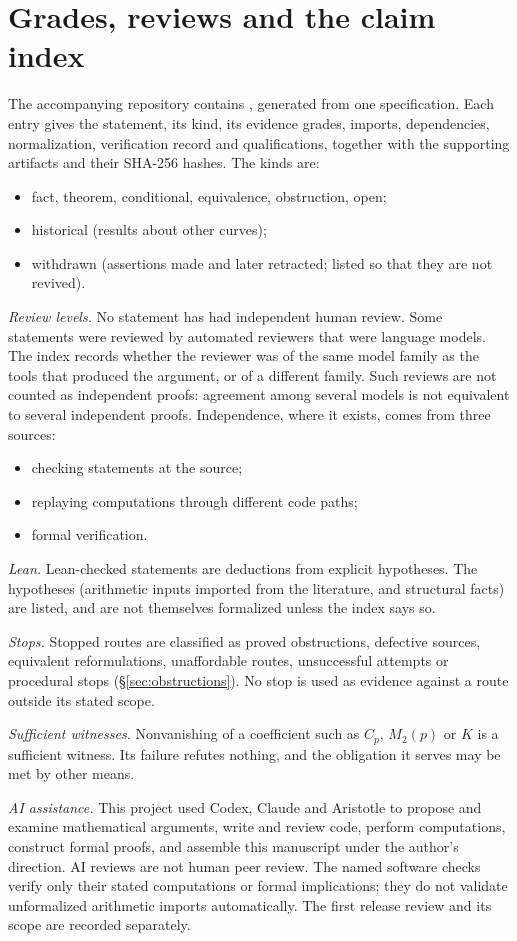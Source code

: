 \section{Grades, reviews and the claim index}\label{app:grades}

The accompanying repository contains , generated from one specification. Each entry gives the statement, its kind, its evidence grades, imports, dependencies, normalization, verification record and qualifications, together with the supporting artifacts and their SHA-256 hashes. The kinds are:
\begin{itemize}[leftmargin=*]
\item fact, theorem, conditional, equivalence, obstruction, open;
\item historical (results about other curves);
\item withdrawn (assertions made and later retracted; listed so that they are not revived).
\end{itemize}

\emph{Review levels.} No statement has had independent human review. Some statements were reviewed by automated reviewers that were language models. The index records whether the reviewer was of the same model family as the tools that produced the argument, or of a different family. Such reviews are not counted as independent proofs: agreement among several models is not equivalent to several independent proofs. Independence, where it exists, comes from three sources:
\begin{itemize}[leftmargin=*]
\item checking statements at the source;
\item replaying computations through different code paths;
\item formal verification.
\end{itemize}

\emph{Lean.} Lean-checked statements are deductions from explicit hypotheses. The hypotheses (arithmetic inputs imported from the literature, and structural facts) are listed, and are not themselves formalized unless the index says so.

\emph{Stops.} Stopped routes are classified as proved obstructions, defective sources, equivalent reformulations, unaffordable routes, unsuccessful attempts or procedural stops (\S\ref{sec:obstructions}). No stop is used as evidence against a route outside its stated scope.

\emph{Sufficient witnesses.} Nonvanishing of a coefficient such as $C_p$, $M_2(p)$ or $K$ is a sufficient witness. Its failure refutes nothing, and the obligation it serves may be met by other means.

\emph{AI assistance.} This project used Codex, Claude and Aristotle to propose and examine mathematical arguments, write and review code, perform computations, construct formal proofs, and assemble this manuscript under the author's direction. AI reviews are not human peer review. The named software checks verify only their stated computations or formal implications; they do not validate unformalized arithmetic imports automatically. The first release review and its scope are recorded separately.
